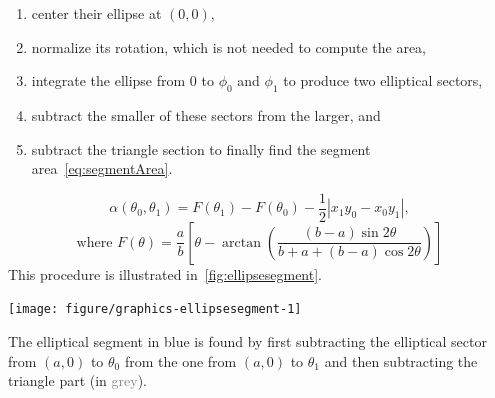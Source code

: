 \documentclass[
  oneside,
  openany,
  numbers=noendperiod,
  parskip=half,
  bibliography=totoc
]{scrbook}\usepackage[]{graphicx}\usepackage{xcolor}
\newenvironment{knitrout}{}{} %
\begin{document}
\begin{enumerate}
\item center their ellipse at $(0, 0)$,
\item normalize its rotation, which is not needed to compute the area,
\item integrate the ellipse from $0$ to $\phi_0$ and $\phi_1$ to produce two
  elliptical sectors,
\item subtract the smaller of these sectors from the larger, and
\item subtract the triangle section to finally find the segment
  area~\eqref{eq:segmentArea}.
\end{enumerate}

\begin{equation*}
\alpha(\theta_0, \theta_1) = F(\theta_1) - F(\theta_0) -
\frac{1}{2}\left|x_1y_0 - x_0y_1\right|,
\label{eq:segmentArea}
\end{equation*}
\[
\text{where } F(\theta) = \frac{a}{b}\left[ \theta -
\arctan{\left(\frac{(b - a)\sin{2\theta}}{b + a +(b - a )\cos{2\theta}} \right)}
\right]
\]
This procedure is illustrated in~\cref{fig:ellipsesegment}.

\begin{marginfigure}
\begin{knitrout}\small
{}\color{fgcolor}

{\centering \texttt{[image: figure/graphics-ellipsesegment-1]} 

}



\end{knitrout}
\caption{The elliptical segment in \textcolor{SteelBlue4}{blue} is found by
first subtracting the elliptical sector from $(a, 0)$ to $\theta_0$ from the one
from $(a, 0)$ to $\theta_1$ and then subtracting the triangle part
(in \textcolor{Grey}{grey}).}
\label{fig:ellipsesegment}
\end{marginfigure}
\end{document}
